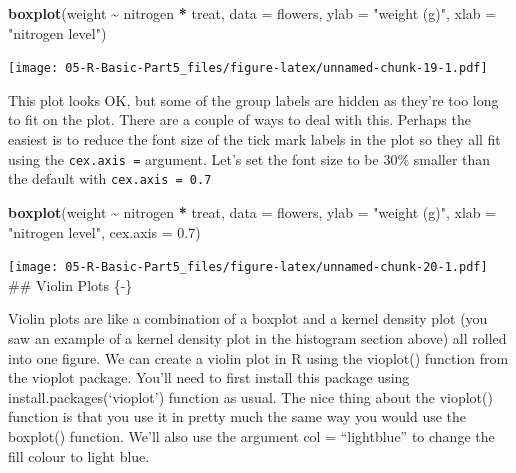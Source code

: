 \documentclass[
]{book}
\newenvironment{Shaded}{\begin{snugshade}}{\end{snugshade}}
\newcommand{\AttributeTok}[1]{\textcolor[rgb]{0.13,0.29,0.53}{#1}}
\newcommand{\FloatTok}[1]{\textcolor[rgb]{0.00,0.00,0.81}{#1}}
\newcommand{\FunctionTok}[1]{\textcolor[rgb]{0.13,0.29,0.53}{\textbf{#1}}}
\newcommand{\NormalTok}[1]{#1}
\newcommand{\SpecialCharTok}[1]{\textcolor[rgb]{0.81,0.36,0.00}{\textbf{#1}}}
\newcommand{\StringTok}[1]{\textcolor[rgb]{0.31,0.60,0.02}{#1}}
\begin{document}
\begin{Shaded}
\begin{Highlighting}[]
\FunctionTok{boxplot}\NormalTok{(weight }\SpecialCharTok{\textasciitilde{}}\NormalTok{ nitrogen }\SpecialCharTok{*}\NormalTok{ treat, }\AttributeTok{data =}\NormalTok{ flowers, }
         \AttributeTok{ylab =} \StringTok{"weight (g)"}\NormalTok{, }\AttributeTok{xlab =} \StringTok{"nitrogen level"}\NormalTok{)}
\end{Highlighting}
\end{Shaded}

\texttt{[image: 05-R-Basic-Part5\_files/figure-latex/unnamed-chunk-19-1.pdf]}

This plot looks OK, but some of the group labels are hidden as they're too long to fit on the plot. There are a couple of ways to deal with this. Perhaps the easiest is to reduce the font size of the tick mark labels in the plot so they all fit using the \texttt{cex.axis\ =} argument. Let's set the font size to be 30\% smaller than the default with \texttt{cex.axis\ =\ 0.7}

\begin{Shaded}
\begin{Highlighting}[]
\FunctionTok{boxplot}\NormalTok{(weight }\SpecialCharTok{\textasciitilde{}}\NormalTok{ nitrogen }\SpecialCharTok{*}\NormalTok{ treat, }\AttributeTok{data =}\NormalTok{ flowers, }
         \AttributeTok{ylab =} \StringTok{"weight (g)"}\NormalTok{, }\AttributeTok{xlab =} \StringTok{"nitrogen level"}\NormalTok{, }
         \AttributeTok{cex.axis =} \FloatTok{0.7}\NormalTok{)}
\end{Highlighting}
\end{Shaded}

\texttt{[image: 05-R-Basic-Part5\_files/figure-latex/unnamed-chunk-20-1.pdf]}
\#\# Violin Plots \{-\}

Violin plots are like a combination of a boxplot and a kernel density plot (you saw an example of a kernel density plot in the histogram section above) all rolled into one figure. We can create a violin plot in R using the vioplot() function from the vioplot package. You'll need to first install this package using install.packages(`vioplot') function as usual. The nice thing about the vioplot() function is that you use it in pretty much the same way you would use the boxplot() function. We'll also use the argument col = ``lightblue'' to change the fill colour to light blue.
\end{document}
